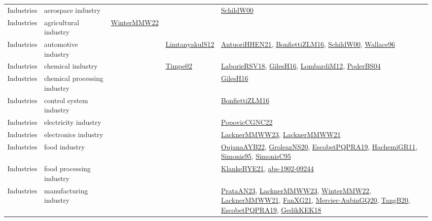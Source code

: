 {\begin{longtable}{lp{3cm}>{\raggedright}p{6cm}>{\raggedright}p{6cm}p{8cm}}
Industries & aerospace industry &  &  & \href{articles/SchildW00.pdf}{SchildW00}\cite{SchildW00}\\
Industries & agricultural industry & \href{papers/WinterMMW22.pdf}{WinterMMW22}\cite{WinterMMW22} &  & \\
Industries & automotive industry &  & \href{articles/LimtanyakulS12.pdf}{LimtanyakulS12}\cite{LimtanyakulS12} & \href{papers/AntuoriHHEN21.pdf}{AntuoriHHEN21}\cite{AntuoriHHEN21}, \href{papers/BonfiettiZLM16.pdf}{BonfiettiZLM16}\cite{BonfiettiZLM16}, \href{articles/SchildW00.pdf}{SchildW00}\cite{SchildW00}, \href{articles/Wallace96.pdf}{Wallace96}\cite{Wallace96}\\
Industries & chemical industry &  & \href{articles/Timpe02.pdf}{Timpe02}\cite{Timpe02} & \href{articles/LaborieRSV18.pdf}{LaborieRSV18}\cite{LaborieRSV18}, \href{papers/GilesH16.pdf}{GilesH16}\cite{GilesH16}, \href{articles/LombardiM12.pdf}{LombardiM12}\cite{LombardiM12}, \href{articles/PoderBS04.pdf}{PoderBS04}\cite{PoderBS04}\\
Industries & chemical processing industry &  &  & \href{papers/GilesH16.pdf}{GilesH16}\cite{GilesH16}\\
Industries & control system industry &  &  & \href{papers/BonfiettiZLM16.pdf}{BonfiettiZLM16}\cite{BonfiettiZLM16}\\
Industries & electricity industry &  &  & \href{papers/PopovicCGNC22.pdf}{PopovicCGNC22}\cite{PopovicCGNC22}\\
Industries & electronics industry &  &  & \href{articles/LacknerMMWW23.pdf}{LacknerMMWW23}\cite{LacknerMMWW23}, \href{papers/LacknerMMWW21.pdf}{LacknerMMWW21}\cite{LacknerMMWW21}\\
Industries & food industry &  &  & \href{papers/OujanaAYB22.pdf}{OujanaAYB22}\cite{OujanaAYB22}, \href{papers/GroleazNS20.pdf}{GroleazNS20}\cite{GroleazNS20}, \href{articles/EscobetPQPRA19.pdf}{EscobetPQPRA19}\cite{EscobetPQPRA19}, \href{articles/HachemiGR11.pdf}{HachemiGR11}\cite{HachemiGR11}, \href{papers/Simonis95.pdf}{Simonis95}\cite{Simonis95}, \href{papers/SimonisC95.pdf}{SimonisC95}\cite{SimonisC95}\\
Industries & food processing industry &  &  & \href{papers/KlankeBYE21.pdf}{KlankeBYE21}\cite{KlankeBYE21}, \href{articles/abs-1902-09244.pdf}{abs-1902-09244}\cite{abs-1902-09244}\\
Industries & manufacturing industry &  &  & \href{articles/PrataAN23.pdf}{PrataAN23}\cite{PrataAN23}, \href{articles/LacknerMMWW23.pdf}{LacknerMMWW23}\cite{LacknerMMWW23}, \href{papers/WinterMMW22.pdf}{WinterMMW22}\cite{WinterMMW22}, \href{papers/LacknerMMWW21.pdf}{LacknerMMWW21}\cite{LacknerMMWW21}, \href{articles/FanXG21.pdf}{FanXG21}\cite{FanXG21}, \href{papers/Mercier-AubinGQ20.pdf}{Mercier-AubinGQ20}\cite{Mercier-AubinGQ20}, \href{papers/TangB20.pdf}{TangB20}\cite{TangB20}, \href{articles/EscobetPQPRA19.pdf}{EscobetPQPRA19}\cite{EscobetPQPRA19}, \href{articles/GedikKEK18.pdf}{GedikKEK18}\cite{GedikKEK18}\\

\end{longtable}}
